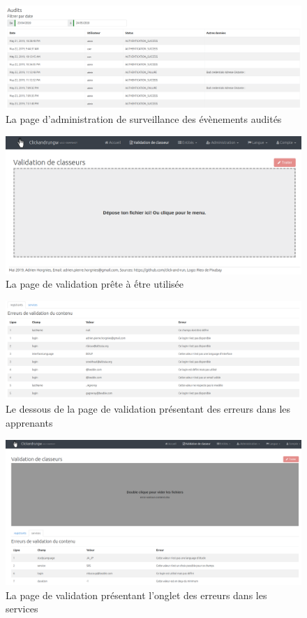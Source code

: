 \begin{figure}[ht]
    \centering
    \includegraphics[width=1\textwidth]{images/screenshot/admin-audits.png}
    \caption{La page d'administration de surveillance des évènements audités}
\end{figure}

\begin{figure}[ht]
    \centering
    \includegraphics[width=1\textwidth]{images/screenshot/validation-empty.png}
    \caption{La page de validation prête à ếtre utilisée}
\end{figure}

\begin{figure}[ht]
    \centering
    \includegraphics[width=1\textwidth]{images/screenshot/validation-registrants.png}
    \caption{Le dessous de la page de validation présentant des erreurs dans les apprenants}
\end{figure}

\begin{figure}[ht]
    \centering
    \includegraphics[width=1\textwidth]{images/screenshot/validation-services.png}
    \caption{La page de validation présentant l'onglet des erreurs dans les services}
\end{figure}
